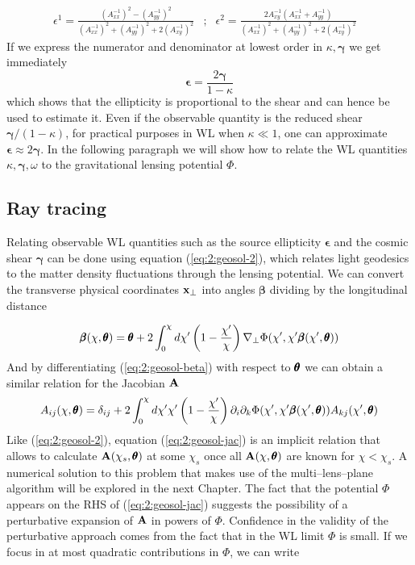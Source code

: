 \begin{equation}
\label{eq:2:ellipticity-2}
\begin{matrix}
\epsilon^1 = \frac{(A^{-1}_{xx})^2-(A^{-1}_{yy})^2}{(A^{-1}_{xx})^2+(A^{-1}_{yy})^2+2(A^{-1}_{xy})^2} & ; & \epsilon^2 = \frac{2A^{-1}_{xy}(A^{-1}_{xx}+A^{-1}_{yy})}{(A^{-1}_{xx})^2+(A^{-1}_{yy})^2+2(A^{-1}_{xy})^2} &
\end{matrix}
\end{equation}
%
If we express the numerator and denominator at lowest order in $\kappa,\pmb{\gamma}$ we get immediately
\begin{equation}
\label{eq:2:ellipticity-3}
\pmb{\epsilon} = \frac{2\pmb{\gamma}}{1-\kappa}
\end{equation}
%
which shows that the ellipticity is proportional to the shear and can hence be used to estimate it. Even if the observable quantity is the reduced shear $\pmb{\gamma}/(1-\kappa)$, for practical purposes in WL when $\kappa\ll 1$, one can approximate $\pmb{\epsilon}\approx 2\pmb{\gamma}$. In the following paragraph we will show how to relate the WL quantities $\kappa,\pmb{\gamma},\omega$ to the gravitational lensing potential $\Phi$. 

\subsection{Ray tracing}
Relating observable WL quantities such as the source ellipticity $\pmb{\epsilon}$ and the cosmic shear $\pmb{\gamma}$ can be done using equation (\ref{eq:2:geosol-2}), which relates light geodesics to the matter density fluctuations through the lensing potential. We can convert the transverse physical coordinates $\mathbf{x}_\perp$ into angles $\pmb{\beta}$ dividing by the longitudinal distance

\begin{equation}
\label{eq:2:geosol-beta}
\pmb{\beta}(\chi,\pmb{\theta}) = \pmb{\theta} + 2\int_0^\chi d\chi'\left(1-\frac{\chi'}{\chi}\right)\nabla_\perp\Phi(\chi',\chi'\pmb{\beta}(\chi',\pmb{\theta}))
\end{equation}
%
And by differentiating (\ref{eq:2:geosol-beta}) with respect to $\pmb{\theta}$ we can obtain a similar relation for the Jacobian $\mathbf{A}$
\begin{equation}
\label{eq:2:geosol-jac}
A_{ij}(\chi,\pmb{\theta}) = \delta_{ij} + 2\int_0^\chi d\chi'\chi'\left(1-\frac{\chi'}{\chi}\right)\partial_i\partial_k\Phi(\chi',\chi'\pmb{\beta}(\chi',\pmb{\theta}))A_{kj}(\chi',\pmb{\theta})
\end{equation}
%
Like (\ref{eq:2:geosol-2}), equation (\ref{eq:2:geosol-jac}) is an implicit relation that allows to calculate $\mathbf{A}(\chi_s,\pmb{\theta})$ at some $\chi_s$ once all $\mathbf{A}(\chi,\pmb{\theta})$ are known for $\chi<\chi_s$. A numerical solution to this problem that makes use of the multi--lens--plane algorithm \citep{RayTracingJain,RayTracingHartlap} will be explored in the next Chapter. 
The fact that the potential $\Phi$ appears on the RHS of (\ref{eq:2:geosol-jac}) suggests the possibility of a perturbative expansion of $\mathbf{A}$ in powers of $\Phi$. Confidence in the validity of the perturbative approach comes from the fact that in the WL limit $\Phi$ is small. If we focus in at most quadratic contributions in $\Phi$, we can write

